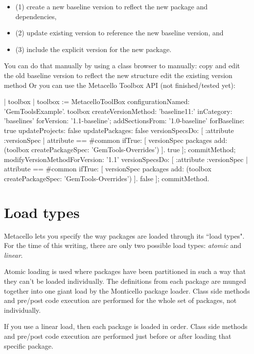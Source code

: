 \documentclass[a4paper,10pt,twoside]{book}
\begin{document}
\begin{code}{}
\begin{code}{}
\begin{itemize}
\item (1) create a new baseline version to reflect the new package and dependencies, 
\item (2) update existing  version to reference the new baseline version, and 
\item (3) include the explicit version for the new package.
\end{itemize}

You can do that manually by using a class browser to manually:
copy and edit the old baseline version to reflect the new structure
edit the existing  version method
Or you can use the Metacello Toolbox API (not finished/tested yet):

\begin{code}{}
| toolbox |
toolbox := MetacelloToolBox configurationNamed: 'GemToolsExample'.
toolbox
  createVersionMethod: 'baseline11:' inCategory: 'baselines' forVersion: '1.1-baseline';
  addSectionsFrom: '1.0-baseline'
     forBaseline: true
     updateProjects: false
     updatePackages: false
     versionSpecsDo: [ :attribute :versionSpec |
        attribute == #common
          ifTrue: [ versionSpec packages add: (toolbox createPackageSpec: 'GemTools-Overrides') ].
        true ];
  commitMethod;
  modifyVersionMethodForVersion: '1.1'
     versionSpecsDo: [ :attribute :versionSpec |
        attribute == #common
          ifTrue: [ versionSpec packages add: (toolbox createPackageSpec: 'GemTools-Overrides') ].
        false ];
  commitMethod.
\end{code}


\section{Load types}
Metacello lets you specify the way packages are loaded through its ``load types". For the time of this writing, there are only two possible load types: \emph{atomic} and \emph{linear}. 

Atomic loading is used where packages have been partitioned in such a way that they can't be loaded individually. The definitions from each package are munged together into one giant load by the Monticello package loader. Class side  methods and pre/post code execution are performed for the whole set of packages, not individually. 

If you use a linear load, then each package is loaded in order. Class side  methods and pre/post code execution are performed just before or after loading that specific package.


\end{code}
\end{code}
\end{document}
